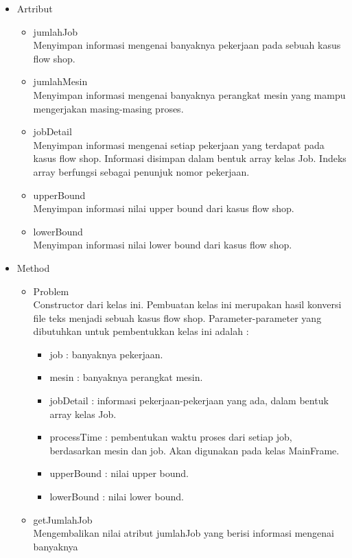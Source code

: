 \begin{itemize}
		\begin{itemize}
			\item Artribut
			\begin{itemize}
				\item jumlahJob \\
				Menyimpan informasi mengenai banyaknya pekerjaan pada sebuah kasus flow shop.
				\item jumlahMesin \\
				Menyimpan informasi mengenai banyaknya perangkat mesin yang mampu mengerjakan
				masing-masing proses.
				\item jobDetail \\
				Menyimpan informasi mengenai setiap pekerjaan yang terdapat pada kasus flow shop. 
				Informasi disimpan dalam bentuk array kelas Job. Indeks array berfungsi
				sebagai penunjuk nomor pekerjaan.
				\item upperBound \\
				Menyimpan informasi nilai upper bound dari kasus flow shop.
				\item lowerBound \\
				Menyimpan informasi nilai lower bound dari kasus flow shop.
			\end{itemize}
			\item Method
			\begin{itemize}
				\item Problem\\
				Constructor dari kelas ini. Pembuatan kelas ini merupakan hasil konversi file teks menjadi 
				sebuah kasus flow shop. Parameter-parameter yang dibutuhkan untuk pembentukkan kelas ini adalah :
				\begin{itemize}
					\item job : banyaknya pekerjaan.
					\item mesin : banyaknya perangkat mesin.
					\item jobDetail : informasi pekerjaan-pekerjaan yang ada, dalam bentuk array kelas Job.
					\item processTime : pembentukan waktu proses dari setiap job, berdasarkan mesin dan job. Akan digunakan
					pada kelas MainFrame.
					\item upperBound : nilai upper bound.
					\item lowerBound : nilai lower bound.
				\end{itemize}
				\item getJumlahJob \\
				Mengembalikan nilai atribut jumlahJob yang berisi informasi mengenai banyaknya

\end{itemize}
\end{itemize}
\end{itemize}
